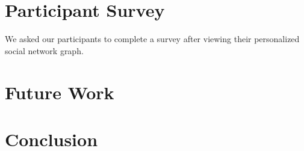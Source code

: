 \documentclass[letterpaper,twocolumn,10pt]{article}
\begin{document}
\section{Participant Survey}
We asked our participants to complete a survey after viewing their personalized social network graph.


\section{Future Work}

\section{Conclusion}
\end{document}
